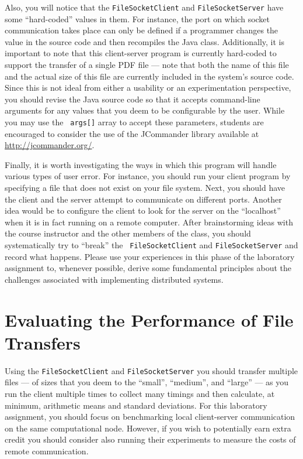 Also, you will notice that the {\tt FileSocketClient} and {\tt FileSocketServer} have some ``hard-coded'' values in
them. For instance, the port on which socket communication takes place can only be defined if a programmer changes the
value in the source code and then recompiles the Java class. Additionally, it is important to note that this
client-server program is currently hard-coded to support the transfer of a single PDF file --- note that both the name
of this file and the actual size of this file are currently included in the system's source code.  Since this is not
ideal from either a usability or an experimentation perspective, you should revise the Java source code so that it
accepts command-line arguments for any values that you deem to be configurable by the user. While you may use the {\tt
args[]} array to accept these parameters, students are encouraged to consider the use of the JCommander library
available at \url{http://jcommander.org/}.

Finally, it is worth investigating the ways in which this program will handle various types of user error. For instance,
you should run your client program by specifying a file that does not exist on your file system. Next, you should have
the client and the server attempt to communicate on different ports. Another idea would be to configure the client to
look for the server on the ``localhost'' when it is in fact running on a remote computer. After brainstorming ideas with
the course instructor and the other members of the class, you should systematically try to ``break'' the {\tt
FileSocketClient} and {\tt FileSocketServer} and record what happens. Please use your experiences in this phase of the
laboratory assignment to, whenever possible, derive some fundamental principles about the challenges associated with
implementing distributed systems.

\section*{Evaluating the Performance of File Transfers}

Using the {\tt FileSocketClient} and {\tt FileSocketServer} you should transfer multiple files --- of sizes that you
deem to the ``small'', ``medium'', and ``large'' --- as you run the client multiple times to collect many timings and
then calculate, at minimum, arithmetic means and standard deviations.  For this laboratory assignment, you should focus
on benchmarking local client-server communication on the same computational node. However, if you wish to potentially
earn extra credit you should consider also running their experiments to measure the costs of remote communication.

